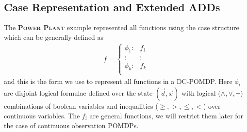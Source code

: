 \documentclass{article} %
\begin{document}
\subsection{Case Representation and Extended ADDs}
The \textsc{\bf Power Plant} example represented all functions using
the case structure which can be generally defined as {\footnotesize
\vspace{-3mm}
\begin{align}
f = 
\begin{cases}
  \phi_1: & f_1 \\ 
 \vdots&\vdots\\ 
  \phi_k: & f_k \\ 
\end{cases} \nonumber
\end{align}
}
and this is the form we use to represent all functions in a DC-POMDP.
Here $\phi_i$ are disjoint logical formulae defined over the state $(\vec{d},\vec{x})$ with logical ($\land,\lor,\neg$) combinations of boolean variables and inequalities ($\geq,>,\leq,<$) over continuous variables.  
The $f_i$ are general functions, we will restrict them later for the
case of continuous observation POMDPs.
\end{document}
